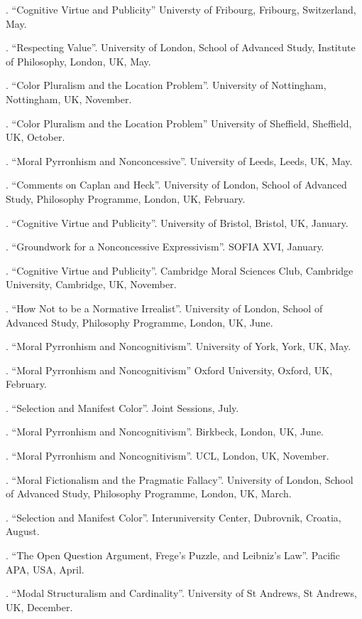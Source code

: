 \documentclass[11pt]{article}
\begin{document}
. ``Cognitive Virtue and Publicity'' Universty of Fribourg, Fribourg, Switzerland, May. 

. ``Respecting Value''. University of London, School of Advanced Study, Institute of Philosophy, London, UK, May.

. ``Color Pluralism and the Location Problem''. University of Nottingham, Nottingham, UK, November.

. ``Color Pluralism and the Location Problem'' University of Sheffield, Sheffield, UK, October.

. ``Moral Pyrronhism and Nonconcessive''. University of Leeds, Leeds, UK, May.

. ``Comments on Caplan and Heck''. University of London, School of Advanced Study, Philosophy Programme, London, UK, February.

. ``Cognitive Virtue and Publicity''. University of Bristol, Bristol, UK, January.

.  ``Groundwork for a Nonconcessive Expressivism''. SOFIA XVI, January.

. ``Cognitive Virtue and Publicity''. Cambridge Moral Sciences Club, Cambridge University, Cambridge, UK, November.

. ``How Not to be a Normative Irrealist''. University of London, School of Advanced Study, Philosophy Programme, London, UK, June.

. ``Moral Pyrronhism and Noncognitivism''. University of York, York, UK, May.

. ``Moral Pyrronhism and Noncognitivism'' Oxford University, Oxford, UK, February.

. ``Selection and Manifest Color''. Joint Sessions, July.

. ``Moral Pyrronhism and Noncognitivism''. Birkbeck, London, UK, June.

. ``Moral Pyrronhism and Noncognitivism''. UCL, London, UK, November.

. ``Moral Fictionalism and the Pragmatic Fallacy''. University of London, School of Advanced Study, Philosophy Programme, London, UK, March.

. ``Selection and Manifest Color''. Interuniversity Center, Dubrovnik, Croatia, August.

. ``The Open Question Argument, Frege's Puzzle, and Leibniz's Law''. Pacific APA, USA, April.

. ``Modal Structuralism and Cardinality''.  University of St Andrews, St Andrews, UK, December.
\end{document}

